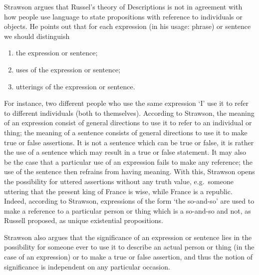 \documentclass{article}
\begin{document}
\maketitle

Strawson argues that Russel's theory of Descriptions is not in agreement with
how people use language to state propositions with reference to individuals
or objects. He points out that for each expression (in his usage: phrase) or 
sentence we should distinguish
\begin{enumerate}
\item the expression or sentence;
\item uses of the expression or sentence;
\item utterings of the expression or sentence.
\end{enumerate}
For instance, two different
people who use the same expression `I' use it to refer to different individuals
(both to themselves). 
According to Strawson, the meaning of an expression consist of general 
directions to use it to refer to an individual or thing; the meaning of a
sentence consists of general directions to use it to make true or false 
assertions. It is not a sentence which can be true or false, it is rather the
use of a sentence which may result in a true or false statement. It may also be
the case that a particular use of an expression fails to make any reference; the
use of the sentence then refrains from having meaning. With this, Strawson opens
the possibility for uttered assertions without any truth value, e.g.~someone
uttering that the present king of France is wise, while France is a republic.
Indeed, according to Strawson, expressions of the form `the so-and-so' are used
to make a reference to a particular person or thing which is a so-and-so and
not, as Russell proposed, as unique existential propositions.

Strawson also argues that the significance of an expression or sentence lies
in the possibility for someone ever to use it to describe an actual person or 
thing (in the case of an expression) or to make a true or false assertion, and
thus the notion of significance is independent on any particular occasion. 
\end{document}
